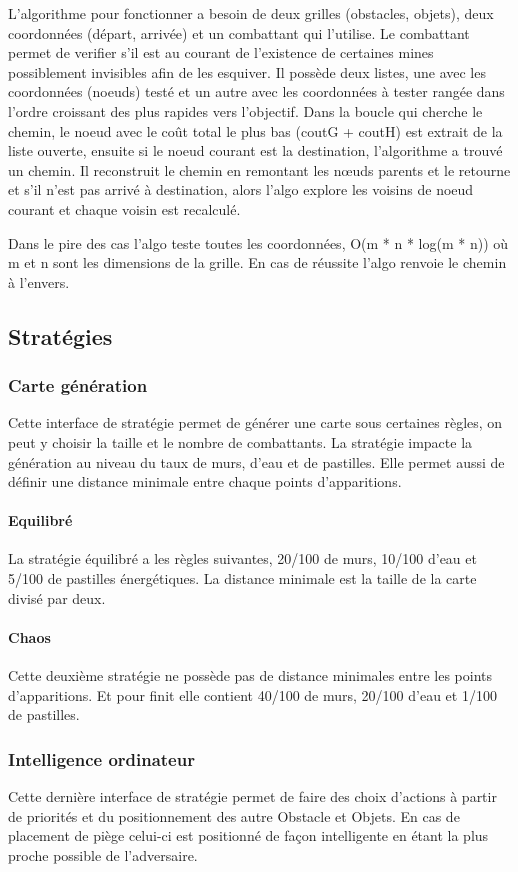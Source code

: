 \documentclass[a4paper,12pt]{article}
\begin{document}
	L’algorithme pour fonctionner a besoin de deux grilles (obstacles, objets), deux coordonnées (départ, arrivée) et un combattant qui l'utilise.
	Le combattant permet de verifier s'il est au courant de l’existence de certaines mines possiblement invisibles afin de les esquiver.
	Il possède deux listes, une avec les coordonnées (noeuds) testé et un autre avec les coordonnées à tester rangée dans l'ordre croissant des plus rapides vers l'objectif.
	Dans la boucle qui cherche le chemin, le noeud avec le coût total le plus bas (coutG + coutH) est extrait de la liste ouverte, ensuite si le noeud courant est la destination, l'algorithme a trouvé un chemin. Il reconstruit le chemin en remontant les nœuds parents et le retourne et s'il n'est pas arrivé à destination, alors l'algo explore les voisins de noeud courant et chaque voisin est recalculé.
	
	Dans le pire des cas l'algo teste toutes les coordonnées, O(m * n * log(m * n)) où m et n sont les dimensions de la grille.
	En cas de réussite l'algo renvoie le chemin à l'envers.
	
	\subsection{Stratégies}
	\subsubsection{Carte génération}
	Cette interface de stratégie permet de générer une carte sous certaines règles, on peut y choisir la taille et le nombre de combattants.
	La stratégie impacte la génération au niveau du taux de murs, d'eau et de pastilles. Elle permet aussi de définir une distance minimale entre chaque points d'apparitions.
	\paragraph{Equilibré}
	La stratégie équilibré a les règles suivantes, 20/100 de murs, 10/100 d'eau et 5/100 de pastilles énergétiques. La distance minimale est la taille de la carte divisé par deux.
	\paragraph{Chaos}
	Cette deuxième stratégie ne possède pas de distance minimales entre les points d'apparitions. Et pour finit elle contient 40/100 de murs, 20/100 d'eau et 1/100 de pastilles.
	
	\subsubsection{Intelligence ordinateur}
	Cette dernière interface de stratégie permet de faire des choix d'actions à partir de priorités et du positionnement des autre Obstacle et Objets.
	En cas de placement de piège celui-ci est positionné de façon intelligente en étant la plus proche possible de l'adversaire. 
\end{document}
